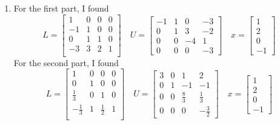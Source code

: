 \documentclass{article}
\begin{document}
\begin{enumerate}
\item For the first part, I found
\begin{equation*}
L = 
\begin{bmatrix}
1 & 0 & 0 & 0\\
-1 & 1 & 0 & 0\\
0 & 1 & 1 & 0\\
-3 & 3 & 2 & 1\\	
\end{bmatrix}
\quad
U = 
\begin{bmatrix}
-1 & 1 & 0 & -3\\
0 & 1 & 3 & -2\\
0 & 0 & -4 & 1\\
0 & 0 & 0 & -3	
\end{bmatrix}
\quad
x = 
\begin{bmatrix}
1\\
2\\
0\\
-1
\end{bmatrix}
\end{equation*}
For the second part, I found
\begin{equation*}
L = 
\begin{bmatrix}
1 & 0 & 0 & 0\\
0 & 1 & 0 & 0\\
\frac{1}{3} & 0 & 1 & 0\\
-\frac{1}{3} & 1 & \frac{1}{2} & 1\\
\end{bmatrix}
\quad
U = 
\begin{bmatrix}
3 & 0 & 1 & 2\\
0 & 1 & -1 & -1\\
0 & 0 & \frac{8}{3} & \frac{1}{3}\\
0 & 0 & 0 & -\frac{3}{2}	
\end{bmatrix}
\quad
x = 
\begin{bmatrix}
1\\
2\\
0\\
-1
\end{bmatrix}
\end{equation*}


\end{enumerate}
\end{document}
